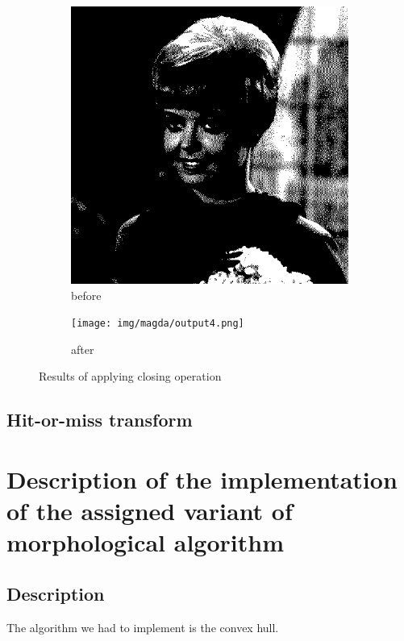 \documentclass[12pt]{article}
\renewcommand{\subfiguresize}{.25\textwidth}
\begin{document}
\begin{figure}[H]
\begin{subfigure}[t]{\subfiguresize}
        \includegraphics[width=\textwidth]{img/magda/girlbw.png}
        \caption{before}
    \end{subfigure}
    \hspace{2em}
    \begin{subfigure}[t]{\subfiguresize}\centering
        \texttt{[image: img/magda/output4.png]}
        \caption{after}
    \end{subfigure}
    \caption{Results of applying closing operation}
\end{figure}  

\subsection{Hit-or-miss transform}

\section{Description of the implementation of the assigned variant of morphological algorithm}

\subsection{Description}
The algorithm we had to implement is the convex hull.
\end{document}
